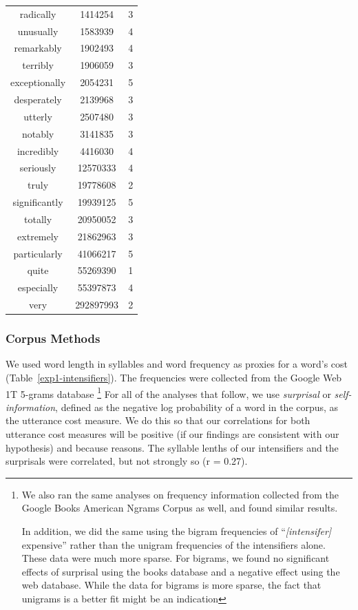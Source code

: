 \documentclass[10pt,letterpaper]{article}
\newcommand{\w}[1]{\emph{#1}}
\newcommand{\todo}[1]{{\color{red}#1}}
\begin{document}
\begin{table}[ht]
\begin{center}
\begin{tabular}{ccc}
    radically & 1414254 & 3 \\
    unusually & 1583939 & 4 \\
    remarkably & 1902493 & 4 \\
    terribly & 1906059 & 3 \\
    exceptionally & 2054231 & 5 \\
    desperately & 2139968 & 3 \\
    utterly & 2507480 & 3 \\
    notably & 3141835 & 3 \\
    incredibly & 4416030 & 4 \\
    seriously & 12570333 & 4 \\
    truly & 19778608 & 2 \\
    significantly & 19939125 & 5 \\
    totally & 20950052 & 3 \\
    extremely & 21862963 & 3 \\
    particularly & 41066217 & 5 \\
    quite & 55269390 & 1 \\
    especially & 55397873 & 4 \\
    very & 292897993 & 2
  \end{tabular}
 \end{center}
\end{table}

\subsubsection{Corpus Methods}

We used word length in syllables and word frequency as proxies for a word's cost (Table~\ref{exp1-intensifiers}).
The frequencies were collected from the Google Web 1T 5-grams database \cite{web1t5gram}\footnote{
We also ran the same analyses on frequency information collected from the Google Books American Ngrams Corpus \cite{books2011} as well, and found similar results.

In addition, we did the same using the bigram frequencies of ``\emph{[intensifer]} expensive'' rather than the unigram frequencies of the intensifiers alone. These data were much more sparse. For bigrams, we found no significant effects of surprisal using the books database and a negative effect using the web database. While the data for bigrams is more sparse, the fact that unigrams is a better fit might be an indication 
}
For all of the analyses that follow, we use \w{surprisal} or \w{self-information}, defined as the negative log probability of a word in the corpus, as the utterance cost measure. We do this so that our correlations for both utterance cost measures will be positive (if our findings are consistent with our hypothesis) and because \todo{reasons}. The syllable lenths of our intensifiers and the surprisals %
were correlated, but not strongly so (r = 0.27).
\end{document}
